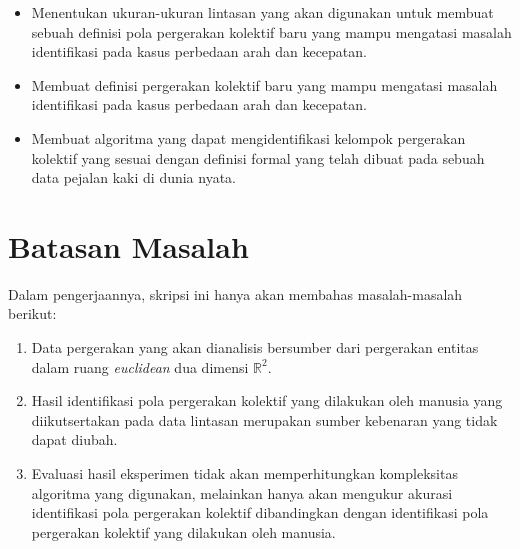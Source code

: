\iffalse

\lionov{``mengetahui'' jangan jadi tujuan, tapi jadi gini aja, pertama menentukan atau membuat ukuran yang baru yang akan digunakan, kedua membuat pemodelan yang baru, ketiga membuat algoritma}

\fi
\begin{itemize}
    \item Menentukan ukuran-ukuran lintasan yang akan digunakan untuk membuat sebuah definisi pola pergerakan kolektif baru yang mampu mengatasi masalah identifikasi pada kasus perbedaan arah dan kecepatan.
    \item Membuat definisi pergerakan kolektif baru yang mampu mengatasi masalah identifikasi pada kasus perbedaan arah dan kecepatan.
    \item Membuat algoritma yang dapat mengidentifikasi kelompok pergerakan kolektif yang sesuai dengan definisi formal yang telah dibuat pada sebuah data pejalan kaki di dunia nyata.
\end{itemize}

\section{Batasan Masalah}
\label{sec:batasan}

\iffalse

\lionov{ini bukan batasan, batasan itu misalnya: data cuma di R2, terus si kunci jawaban yang ada di data lintasan gak akan diubah-ubah, terus eksperimen hanya akan melihat hasil tapi tidak melihat penggunaan tempat dan waktu}

\fi
Dalam pengerjaannya, skripsi ini hanya akan membahas masalah-masalah berikut:

\begin{enumerate}
    \item Data pergerakan yang akan dianalisis bersumber dari pergerakan entitas dalam ruang \textit{euclidean} dua dimensi $\mathbb{R}^2$.
    \item Hasil identifikasi pola pergerakan kolektif yang dilakukan oleh manusia yang diikutsertakan pada data lintasan merupakan sumber kebenaran yang tidak dapat diubah.
    \item Evaluasi hasil eksperimen tidak akan memperhitungkan kompleksitas algoritma yang digunakan, melainkan hanya akan mengukur akurasi identifikasi pola pergerakan kolektif dibandingkan dengan identifikasi pola pergerakan kolektif yang dilakukan oleh manusia.
\end{enumerate}

